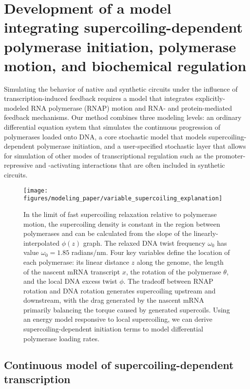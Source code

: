 \documentclass[11pt]{article}
\begin{document}
\section{Development of a model integrating supercoiling-dependent polymerase initiation, polymerase motion, and biochemical regulation}
Simulating the behavior of native and synthetic circuits under the influence of transcription-induced feedback requires a model that integrates explicitly-modeled RNA polymerase (RNAP) motion and RNA- and protein-mediated feedback mechanisms.
Our method combines three modeling levels: an ordinary differential equation system that simulates the continuous progression of polymerases loaded onto DNA, a core stochastic model that models supercoiling-dependent polymerase initiation, and a user-specified stochastic layer that allows for simulation of other modes of transcriptional regulation such as the promoter-repressive and -activating interactions that are often included in synthetic circuits.

\begin{figure}[htb]
    \centering
    \texttt{[image: figures/modeling\_paper/variable\_supercoiling\_explanation]}
    \caption{In the limit of fast supercoiling relaxation relative to polymerase motion, the supercoiling density is constant in the region between polymerases and can be calculated from the slope of the linearly-interpolated \(\phi(z)\) graph. The relaxed DNA twist frequency \(\omega_0\) has value \(\omega_0 = 1.85\) radians/nm. Four key variables define the location of each polymerase: its linear distance \(z\) along the genome, the length of the nascent mRNA transcript \(x\), the rotation of the polymerase \(\theta\), and the local DNA excess twist \(\phi\). The tradeoff between RNAP rotation and DNA rotation generates supercoiling upstream and downstream, with the drag generated by the nascent mRNA primarily balancing the torque caused by generated supercoils. Using an energy model responsive to local supercoiling, we can derive supercoiling-dependent initiation terms to model differential polymerase loading rates.}
    \label{fig:key_variables_diagram}
\end{figure}

\subsection{Continuous model of supercoiling-dependent transcription}
\end{document}
